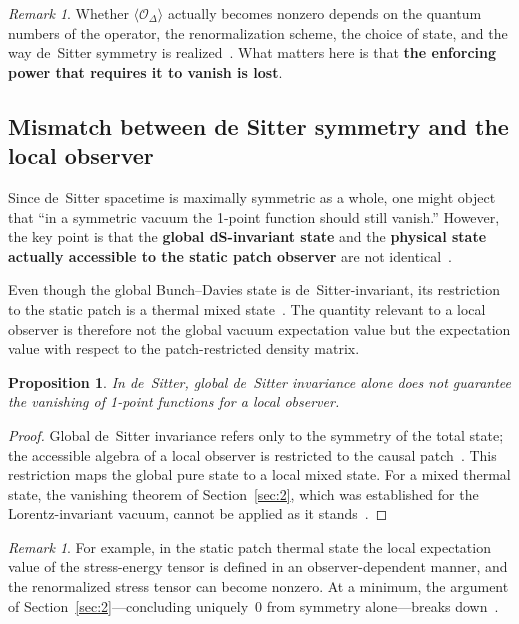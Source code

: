 \documentclass[
  aps,
  prd,
  preprint,
  groupedaddress,
  nofootinbib,
  longbibliography
]{revtex4-2}
\newtheorem{proposition}[definition]{Proposition}
\theoremstyle{remark}
\newtheorem{remark}[definition]{Remark}
\begin{document}
\begin{remark}\label{rem:nonzero-conditional}
Whether $\langle\mathcal{O}_\Delta\rangle$ actually becomes
nonzero depends on the quantum numbers of the operator, the
renormalization scheme, the choice of state, and the way
de~Sitter symmetry is
realized~\cite{ref20,ref21,ref22,ref23,ref26,ref27}.
What matters here is that \textbf{the enforcing power that
requires it to vanish is lost}.
\end{remark}

\subsection{Mismatch between de Sitter symmetry and the local observer}%
  \label{subsec:4-4}

Since de~Sitter spacetime is maximally symmetric as a whole, one
might object that ``in a symmetric vacuum the 1-point function
should still vanish.''
However, the key point is that the \textbf{global dS-invariant
state} and the \textbf{physical state actually accessible to the
static patch observer} are not
identical~\cite{ref17,ref20,ref21}.

Even though the global Bunch--Davies state is de~Sitter-invariant,
its restriction to the static patch is a thermal mixed
state~\cite{ref15,ref17,ref20,ref21,ref23}.
The quantity relevant to a local observer is therefore not the
global vacuum expectation value but the expectation value with
respect to the patch-restricted density matrix.

\begin{proposition}\label{prop:global-not-enough}
In de~Sitter, global de~Sitter invariance alone does not guarantee
the vanishing of 1-point functions for a local observer.
\end{proposition}

\begin{proof}
Global de~Sitter invariance refers only to the symmetry of the
total state; the accessible algebra of a local observer is
restricted to the causal patch~\cite{ref17,ref20,ref21}.
This restriction maps the global pure state to a local mixed state.
For a mixed thermal state, the vanishing theorem of
Section~\ref{sec:2}, which was established for the
Lorentz-invariant vacuum, cannot be applied as it
stands~\cite{ref15,ref17,ref20,ref21,ref23}.
\end{proof}

\begin{remark}\label{rem:stress-tensor-observer}
For example, in the static patch thermal state the local
expectation value of the stress-energy tensor is defined in an
observer-dependent manner, and the renormalized stress tensor can
become nonzero.
At a minimum, the argument of Section~\ref{sec:2}---concluding
uniquely~$0$ from symmetry alone---breaks
down~\cite{ref17,ref20,ref21}.
\end{remark}
\end{document}
